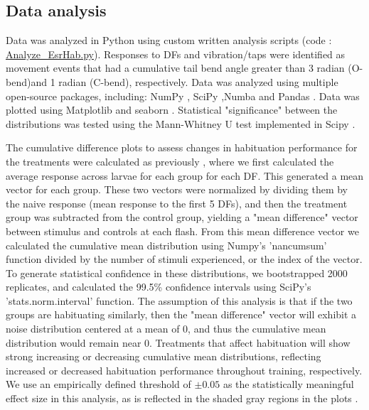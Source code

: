 \documentclass[9.5pt,lineno]{RandlettLab_elife}
\begin{document}
\subsection{Data analysis}

Data was analyzed in Python using custom written analysis scripts (code : \href{https://github.com/owenrandlett/2025_HabEstrogen/blob/main/code/Analyze_EsrHab.py}{Analyze\_EsrHab.py}). 
Responses to DFs and vibration/taps were identified as movement events that had a cumulative tail bend angle greater than 3 radian (O-bend)and 1 radian (C-bend), respectively. Data was analyzed using multiple open-source packages, including: NumPy \citep{Harris2020-bg}, SciPy \citep{Virtanen2020-sz},Numba \citep{lam2015numba} and Pandas \citep{mckinney-proc-scipy-2010}.
Data was plotted using Matplotlib \citep{Hunter2007-ub} and seaborn \citep{Waskom2021-ah}.
Statistical "significance" between the distributions was tested using the Mann-Whitney U test implemented in Scipy \citep{Virtanen2020-sz}.

The cumulative difference plots to assess changes in habituation performance for the treatments were calculated as previously \citep{Randlett2019-fj}, where we first
calculated the average response across larvae for each group for each DF.
This generated a mean vector for each group. 
These two vectors were normalized by dividing them by the naive response (mean response to the first 5 DFs), and then the treatment group was subtracted from the control group, yielding a "mean difference" vector between stimulus and controls at each flash. 
From this mean difference vector we calculated the cumulative mean distribution using Numpy's 'nancumsum' function divided by the number of stimuli experienced, or the index of the vector. 
To generate statistical confidence in these distributions, we bootstrapped 2000 replicates, and calculated the 99.5\% confidence intervals using SciPy's 'stats.norm.interval' function.
The assumption of this analysis is that if the two groups are habituating similarly, then the "mean difference" vector will exhibit a noise distribution centered at a mean of 0, and thus the cumulative mean distribution would remain near 0. 
Treatments that affect habituation will show strong increasing or decreasing cumulative mean distributions, reflecting increased or decreased habituation performance throughout
training, respectively.
We use an empirically defined threshold of $\pm0.05$ as the statistically meaningful effect size in this analysis, as is reflected in the shaded gray regions in the plots \citep{Randlett2019-fj}.
\end{document}
